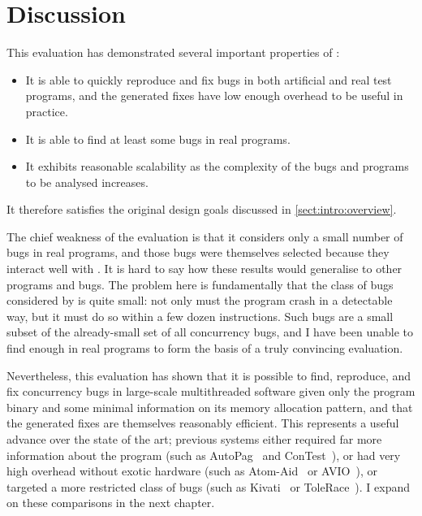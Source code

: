 \section{Discussion}

This evaluation has demonstrated several important properties of
{\technique}:
\begin{itemize}
\item It is able to quickly reproduce and fix bugs in both artificial
  and real test programs, and the generated fixes have low enough
  overhead to be useful in practice.
\item It is able to find at least some bugs in real programs.
\item It exhibits reasonable scalability as the complexity of the
  bugs and programs to be analysed increases.
\end{itemize}
It therefore satisfies the original design goals discussed in
\autoref{sect:intro:overview}.

The chief weakness of the evaluation is that it considers only a small
number of bugs in real programs, and those bugs were themselves
selected because they interact well with {\technique}.  It is hard to
say how these results would generalise to other programs and bugs.
The problem here is fundamentally that the class of bugs considered by
{\technique} is quite small: not only must the program crash in a
detectable way, but it must do so within a few dozen instructions.
Such bugs are a small subset of the already-small set of all
concurrency bugs, and I have been unable to find enough in real
programs to form the basis of a truly convincing evaluation.

Nevertheless, this evaluation has shown that it is possible to find,
reproduce, and fix concurrency bugs in large-scale multithreaded
software given only the program binary and some minimal information on
its memory allocation pattern, and that the generated fixes are
themselves reasonably efficient.  This represents a useful advance
over the state of the art; previous systems either required far more
information about the program (such as AutoPag~\cite{Lin2007} and
ConTest~\cite{FFFKrena2007}), or had very high overhead without exotic
hardware (such as Atom-Aid~\cite{Lucia2009} or AVIO~\cite{Lu}), or
targeted a more restricted class of bugs (such as
Kivati~\cite{Chew2010} or ToleRace~\cite{Kirovski2007}).  I expand on
these comparisons in the next chapter.
